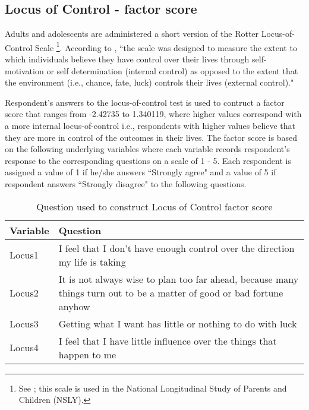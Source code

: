 \subsection{Locus of Control - factor score}
Adults and adolescents are administered a short version of the Rotter Locus-of-Control Scale \footnote{See \cite{Rotter_1966_PMGaA}; this scale is used in the National Longitudinal Study of Parents and Children (NSLY).}. According to  \citet{Miller_2004_BOOKNLSY79}, ``the scale was designed to measure the extent to which individuals believe they have control over their lives through self-motivation or self determination (internal control) as opposed to the extent that the environment (i.e., chance, fate, luck) controls their lives (external control)."

Respondent's answers to the locus-of-control test is used to contruct a factor score that ranges from -2.42735 to 1.340119, where higher values correspond with a more internal locus-of-control i.e., respondents with higher values believe that they are more in control of the outcomes in their lives. The factor score is based on the following underlying variables where each variable records respondent's response to the corresponding questions on a scale of 1 - 5. Each respondent is assigned a value of 1 if he/she answers ``Strongly agree" and a value of 5 if respondent answers ``Strongly disagree" to the following questions. \\

\begin{table}[H]
\begin{center}
\footnotesize{
\caption{Question used to construct Locus of Control factor score}
	\begin{tabular}{l L{11cm}}
	\hline
	\textbf{Variable} & \textbf{Question} \\
	\hline
	
	Locus1		& I feel that I don’t have enough control over the direction my life is taking \\	
	Locus2		& It is not always wise to plan too far ahead, because many things turn out to be a matter of good or bad fortune anyhow\\
	Locus3		& Getting what I want has little or nothing to do with luck \\
	Locus4		& I feel that I have little influence over the things that happen to me \\
	
	\hline
	
	\end{tabular}
}

\end{center}
\end{table}


